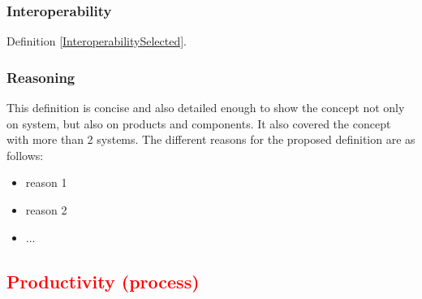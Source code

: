 \documentclass[letterpaper, cleveref]{lipics-v2019}
\newcommand{\authornote}[3]{\textcolor{#1}{[#3 ---#2]}}
\newcommand{\authornote}[3]{}
\newcommand{\ad}[1]{\authornote{cyan}{AD}{#1}} %
\newcommand{\notdone}[1]{\textcolor{red}{#1}}
\theoremstyle{definition}
\begin{document}
\begin{mybox}
\subsubsection*{Interoperability}
Definition \ref{InteroperabilitySelected}.
\end{mybox}

\subsubsection*{Reasoning}

This definition is concise and also detailed enough to show the concept not only
on system, but also on products and components. It also covered the concept with
more than 2 systems.  The different reasons for the proposed definition are as
follows:

\begin{itemize}
  \item reason 1
  \item reason 2
  \item ...
\end{itemize}


\subsection{\notdone{Productivity (process)}} %
\end{document}
